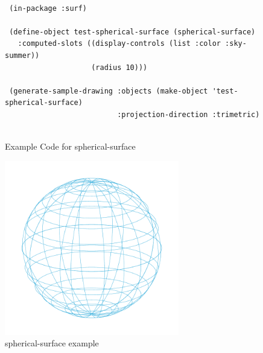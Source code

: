 \documentclass [11pt]{book}
\begin{document}
\begin{itemize}
\begin{description}
\end{description}




\begin{figure}
\begin{lrbox}{\boxedverb}
\begin{minipage}{\linewidth}
{\small

\begin{verbatim}
                  
 (in-package :surf)

 (define-object test-spherical-surface (spherical-surface)
   :computed-slots ((display-controls (list :color :sky-summer))
                    (radius 10)))

 (generate-sample-drawing :objects (make-object 'test-spherical-surface)
                          :projection-direction :trimetric)


\end{verbatim}}
\end{minipage}
\end{lrbox}
\fbox{\usebox{\boxedverb}}

\caption{Example Code for spherical-surface}

\label{fig:example-code-spherical-surface}

\end{figure}

\begin{figure}
\begin{center}
\includegraphics[width=3in,height=3in]{../images/example-spherical-surface.pdf}
\end{center}

\caption{spherical-surface example}

\label{fig:spherical-surface}

\end{figure}






\end{itemize}
\end{document}
